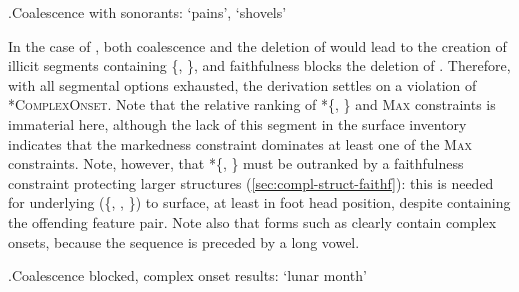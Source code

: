 \ex.\label{poaniou-paliou-tableau}Coalescence with sonorants:  `pains', \ipa{[ˈpaːjəw]} `shovels'\\

In the case of \ipa{[r]}, both coalescence and the deletion of  would lead to the creation of illicit segments containing \{, \}, and faithfulness blocks the deletion of . Therefore, with all segmental options exhausted, the derivation settles on a violation of *\textsc{ComplexOnset}. Note that the relative ranking of *\{, \} and \textsc{Max} constraints is immaterial here, although the lack of this segment in the surface inventory indicates that the markedness constraint dominates at least one of the \textsc{Max} constraints. Note, however, that *\{, \} must be outranked by a faithfulness constraint protecting larger structures (\cref{sec:compl-struct-faithf}): this is needed for underlying  (\{, , \}) to surface, at least in foot head position, despite containing the offending feature pair. Note also that forms such as \ipa{[ˈlwɛːrjad̥]} clearly contain complex onsets, because the sequence \ipa{[rj]} is preceded by a long vowel.

\ex.\label{loariad-tableau}Coalescence blocked, complex onset results: \ipa{[ˈlwɛːrjad̥]} `lunar month'\\

